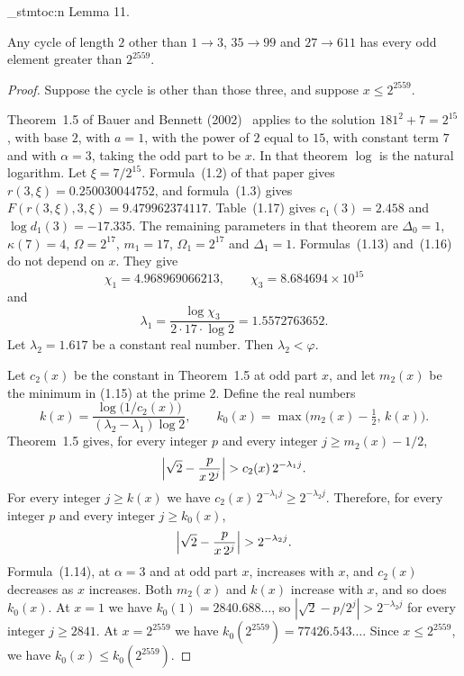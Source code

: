 \documentclass[11pt]{article}
\newenvironment{named}[1]{%
  \par\addvspace{\medskipamount}%
  \pagebreak[3]%
  \noindent{\bfseries #1}\space\ignorespaces
  \stmtoc{#1}%
}{\par\addvspace{\medskipamount}}
\newcommand{\stmtoc}[1]{ \qn_stmtoc:n {#1} }
\newcounter{lemmaref}
\newcommand{\marklemma}[2]{%
  \setcounter{lemmaref}{#1}%
  \addtocounter{lemmaref}{-1}%
  \refstepcounter{lemmaref}%
  \label{#2}%
}
\begin{document}
\begin{named}{Lemma 11.}
\marklemma{11}{lem:onset-three}
Any cycle of length $2$ other than $1 \to 3$, $35 \to 99$ and $27 \to 611$ has every odd element greater than $2^{2559}$.
\end{named}

\begin{proof}
Suppose the cycle is other than those three, and suppose $x \le 2^{2559}$.

Theorem~1.5 of Bauer and Bennett (2002)~\cite{bauer-bennett-2002} applies to the solution $181^2 + 7 = 2^{15}$, with base $2$, with $a = 1$, with the power of $2$ equal to $15$, with constant term $7$ and with $\alpha = 3$, taking the odd part to be $x$.
In that theorem $\log$ is the natural logarithm.
Let $\xi = 7/2^{15}$.
Formula~(1.2) of that paper gives $r(3, \xi) = 0.250030044752$, and formula~(1.3) gives $F(r(3, \xi), 3, \xi) = 9.479962374117$.
Table~(1.17) gives $c_1(3) = 2.458$ and $\log d_1(3) = -17.335$.
The remaining parameters in that theorem are $\Delta_0 = 1$, $\kappa(7) = 4$, $\Omega = 2^{17}$, $m_1 = 17$, $\Omega_1 = 2^{17}$ and $\Delta_1 = 1$.
Formulas~(1.13) and~(1.16) do not depend on $x$.
They give
\[
\chi_1 = 4.968969066213, \qquad \chi_3 = 8.684694 \times 10^{15}
\]
and
\[
\lambda_1 = \frac{\log \chi_3}{2 \cdot 17 \cdot \log 2} = 1.5572763652.
\]
Let $\lambda_2 = 1.617$ be a constant real number.
Then $\lambda_2 < \varphi$.

Let $c_2(x)$ be the constant in Theorem~1.5 at odd part $x$, and let $m_2(x)$ be the minimum in (1.15) at the prime $2$.
Define the real numbers
\[
k(x) = \frac{\log\bigl(1/c_2(x)\bigr)}{(\lambda_2 - \lambda_1)\log 2}, \qquad k_0(x) = \max\bigl(m_2(x) - \tfrac12,\, k(x)\bigr).
\]
Theorem~1.5 gives, for every integer $p$ and every integer $j \ge m_2(x) - 1/2$,
\[
\Bigl| \sqrt{2} - \frac{p}{x\, 2^{j}} \Bigr| > c_2(x)\, 2^{-\lambda_1 j}.
\]
For every integer $j \ge k(x)$ we have $c_2(x)\, 2^{-\lambda_1 j} \ge 2^{-\lambda_2 j}$.
Therefore, for every integer $p$ and every integer $j \ge k_0(x)$,
\[
\Bigl| \sqrt{2} - \frac{p}{x\, 2^{j}} \Bigr| > 2^{-\lambda_2 j}.
\]
Formula~(1.14), at $\alpha = 3$ and at odd part $x$, increases with $x$, and $c_2(x)$ decreases as $x$ increases.
Both $m_2(x)$ and $k(x)$ increase with $x$, and so does $k_0(x)$.
At $x = 1$ we have $k_0(1) = 2840.688\ldots$, so $|\sqrt{2} - p/2^{j}| > 2^{-\lambda_2 j}$ for every integer $j \ge 2841$.
At $x = 2^{2559}$ we have $k_0(2^{2559}) = 77426.543\ldots$.
Since $x \le 2^{2559}$, we have $k_0(x) \le k_0(2^{2559})$.


\end{proof}
\end{document}
